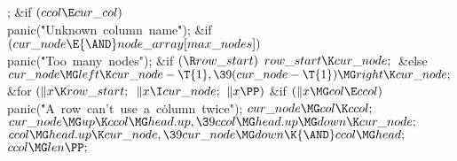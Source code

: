 ;\2\6
\&{if} ${}(\\{ccol}\E\\{cur\_col}){}$\1\5
\\{panic}(\.{"Unknown\ column\ name}\)\.{"});\2\6
\&{if} ${}(\\{cur\_node}\E{\AND}\\{node\_array}[\\{max\_nodes}]){}$\1\5
\\{panic}(\.{"Too\ many\ nodes"});\2\6
\&{if} ${}(\R\\{row\_start}){}$\1\5
${}\\{row\_start}\K\\{cur\_node};{}$\2\6
\&{else}\1\5
${}\\{cur\_node}\MG\\{left}\K\\{cur\_node}-\T{1},\39(\\{cur\_node}-\T{1})\MG%
\\{right}\K\\{cur\_node};{}$\2\6
\&{for} ${}(\|x\K\\{row\_start};{}$ ${}\|x\I\\{cur\_node};{}$ ${}\|x\PP){}$\1\6
\&{if} ${}(\|x\MG\\{col}\E\\{ccol}){}$\1\5
\\{panic}(\.{"A\ row\ can't\ use\ a\ c}\)\.{olumn\ twice"});\2\2\6
${}\\{cur\_node}\MG\\{col}\K\\{ccol};{}$\6
${}\\{cur\_node}\MG\\{up}\K\\{ccol}\MG\\{head}.\\{up},\39\\{ccol}\MG\\{head}.%
\\{up}\MG\\{down}\K\\{cur\_node};{}$\6
${}\\{ccol}\MG\\{head}.\\{up}\K\\{cur\_node},\39\\{cur\_node}\MG\\{down}\K{%
\AND}\\{ccol}\MG\\{head};{}$\6
${}\\{ccol}\MG\\{len}\PP;{}$\6
